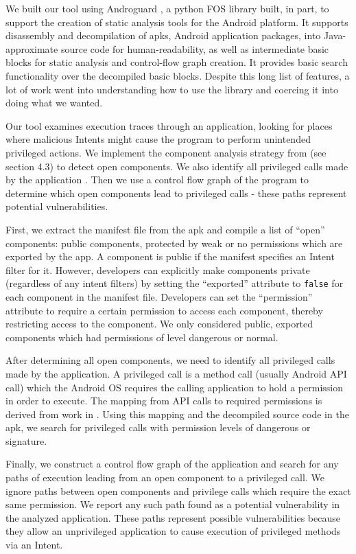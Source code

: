 \documentclass[12pt,a4paper]{article}
\begin{document}
We built our tool using Androguard \cite{androguard}, a python FOS library
built, in part, to support the creation of static analysis tools for the Android
platform. It supports disassembly and decompilation of apks, Android application
packages, into Java-approximate source code for human-readability, as well as
intermediate basic blocks for static analysis and control-flow graph
creation. It provides basic search functionality over the decompiled basic
blocks. Despite this long list of features, a lot of work went into
understanding how to use the library and coercing it into doing what we wanted.

Our tool examines execution traces through an application, looking for places
where malicious Intents might cause the program to perform unintended privileged
actions. We implement the component analysis strategy from
\cite{chin_analyzing_2011} (see section 4.3) to detect open components. We also
identify all privileged calls made by the application
\cite{felt_android_2011}. Then we use a control flow graph of the program to
determine which open components lead to privileged calls - these paths represent
potential vulnerabilities. 

First, we extract the manifest file from the apk and compile a list of ``open''
components: public components, protected by weak or no permissions which are
exported by the app. A component is public if the manifest specifies an Intent
filter for it. However, developers can explicitly make components private
(regardless of any intent filters) by setting the ``exported'' attribute to
\texttt{false} for each component in the manifest file. Developers can set the
``permission'' attribute to require a certain permission to access each
component, thereby restricting access to the component. We only considered
public, exported components which had permissions of level dangerous or normal.

After determining all open components, we need to identify all privileged calls
made by the application. A privileged call is a method call (usually Android API
call) which the Android OS requires the calling application to hold a permission
in order to execute. The mapping from API calls to required permissions is
derived from work in \cite{felt_android_2011}. Using this mapping and the
decompiled source code in the apk, we search for privileged calls with
permission levels of dangerous or signature.

Finally, we construct a control flow graph of the application and search for any
paths of execution leading from an open component to a privileged call. We
ignore paths between open components and privilege calls which require the exact
same permission. We report any such path found as a potential vulnerability in
the analyzed application. These paths represent possible vulnerabilities because
they allow an unprivileged application to cause execution of privileged methods
via an Intent.
\end{document}
